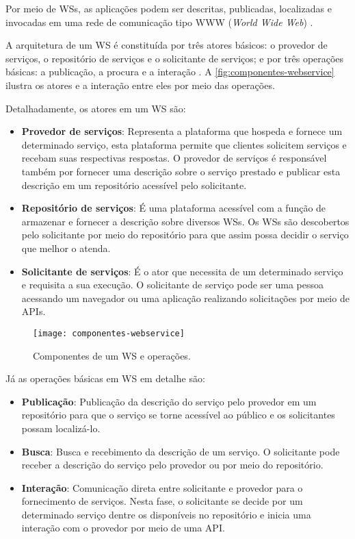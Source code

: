 	Por meio de WSs, as aplicações podem ser descritas, publicadas, localizadas e invocadas em uma rede de comunicação tipo WWW (\textit{World Wide Web}) \cite{souit2013soa}.
	
	A arquitetura de um WS é constituída por três atores básicos: o provedor de serviços, o repositório de serviços e o solicitante de serviços; e por três operações básicas: a publicação, a procura e a interação \cite{gottschalk2002webservices}. A \autoref{fig:componentes-webservice} ilustra os atores e a interação entre eles por meio das operações.
	
	Detalhadamente, os atores em um WS são:
	
	\begin{itemize}
		\item \textbf{Provedor de serviços}: Representa a plataforma que hospeda e fornece um determinado serviço, esta plataforma permite que clientes solicitem serviços e recebam suas respectivas respostas. O provedor de serviços é responsável também por fornecer uma descrição sobre o serviço prestado e publicar esta descrição em um repositório acessível pelo solicitante.
		
		\item \textbf{Repositório de serviços}: É uma plataforma acessível com a função de armazenar e fornecer a descrição sobre diversos WSs. Os WSs são descobertos pelo solicitante por meio do repositório para que assim possa decidir o serviço que melhor o atenda.
		
		\item \textbf{Solicitante de serviços}: É o ator que necessita de um determinado serviço e requisita a sua execução. O solicitante de serviço pode ser uma pessoa acessando um navegador ou uma aplicação realizando solicitações por meio de APIs.		
	\end{itemize}

	\begin{figure}[htb]
		\centering
		\caption{Componentes de um WS e operações.}
		\label{fig:componentes-webservice}
		\texttt{[image: componentes-webservice]}
	\end{figure}
	
	Já as operações básicas em WS em detalhe são:
	
	\begin{itemize}
		\item \textbf{Publicação}: Publicação da descrição do serviço pelo provedor em um repositório para que o serviço se torne acessível ao público e os solicitantes possam localizá-lo.
		
		\item \textbf{Busca}: Busca e recebimento da descrição de um serviço. O solicitante pode receber a descrição do serviço pelo provedor ou por meio do repositório.
		
		\item \textbf{Interação}: Comunicação direta entre solicitante e provedor para o fornecimento de serviços. Nesta fase, o solicitante se decide por um determinado serviço dentre os disponíveis no repositório e inicia uma interação com o provedor por meio de uma API.
	\end{itemize}
	
